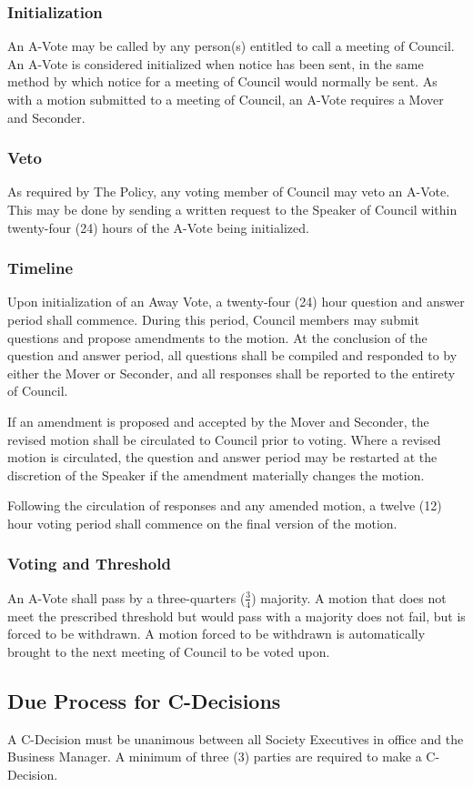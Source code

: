 \subsubsection{Initialization}
An A-Vote may be called by any person(s) entitled to call a meeting of Council.  An A-Vote is considered 
initialized when notice has been sent, in the same method by which notice for a meeting of Council would 
normally be sent. As with a motion submitted to a meeting of Council, an A-Vote requires a Mover and 
Seconder.

\subsubsection{Veto}
As required by The Policy, any voting member of Council may veto an A-Vote.  This may be done by 
sending a written request to the Speaker of Council within twenty-four (24) hours of the A-Vote being 
initialized.

\subsubsection{Timeline}
Upon initialization of an Away Vote, a twenty-four (24) hour question and answer 
period shall commence. During this period, Council members may submit questions 
and propose amendments to the motion. At the conclusion of the question and 
answer period, all questions shall be compiled and responded to by either the 
Mover or Seconder, and all responses shall be reported to the entirety of Council.

If an amendment is proposed and accepted by the Mover and Seconder, the revised 
motion shall be circulated to Council prior to voting. Where a revised motion is 
circulated, the question and answer period may be restarted at the discretion of 
the Speaker if the amendment materially changes the motion.

Following the circulation of responses and any amended motion, a twelve (12) 
hour voting period shall commence on the final version of the motion.

\subsubsection{Voting and Threshold}
An A-Vote shall pass by a three-quarters ($\frac{3}{4}$) majority.  A motion that does not meet the prescribed 
threshold but would pass with a majority does not fail, but is forced to be withdrawn.  A motion 
forced to be withdrawn is automatically brought to the next meeting of Council to be voted upon.

\subsection{Due Process for C-Decisions}
A C-Decision must be unanimous between all Society Executives in office and the Business Manager.  A 
minimum of three (3) parties are required to make a C-Decision.
